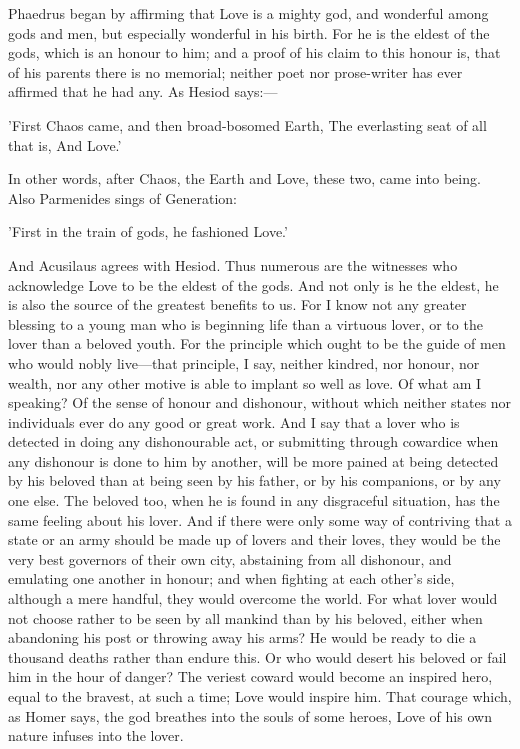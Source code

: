 \para[48] Phaedrus began by affirming that Love is a mighty god, and wonderful among gods and men, but especially wonderful in his birth. For he is the eldest of the gods, which is an honour to him; and a proof of his claim to this honour is, that of his parents there is no memorial; neither poet nor prose-writer has ever affirmed that he had any. As Hesiod says:---

\para[49] 'First Chaos came, and then broad-bosomed Earth, The everlasting seat of all that is, And Love.'

\para[50] In other words, after Chaos, the Earth and Love, these two, came into being. Also Parmenides sings of Generation:

\para[51] 'First in the train of gods, he fashioned Love.'

\para[52] And Acusilaus agrees with Hesiod. Thus numerous are the witnesses who acknowledge Love to be the eldest of the gods. And not only is he the eldest, he is also the source of the greatest benefits to us. For I know not any greater blessing to a young man who is beginning life than a virtuous lover, or to the lover than a beloved youth. For the principle which ought to be the guide of men who would nobly live---that principle, I say, neither kindred, nor honour, nor wealth, nor any other motive is able to implant so well as love. Of what am I speaking? Of the sense of honour and dishonour, without which neither states nor individuals ever do any good or great work. And I say that a lover who is detected in doing any dishonourable act, or submitting through cowardice when any dishonour is done to him by another, will be more pained at being detected by his beloved than at being seen by his father, or by his companions, or by any one else. The beloved too, when he is found in any disgraceful situation, has the same feeling about his lover. And if there were only some way of contriving that a state or an army should be made up of lovers and their loves, they would be the very best governors of their own city, abstaining from all dishonour, and emulating one another in honour; and when fighting at each other's side, although a mere handful, they would overcome the world. For what lover would not choose rather to be seen by all mankind than by his beloved, either when abandoning his post or throwing away his arms? He would be ready to die a thousand deaths rather than endure this. Or who would desert his beloved or fail him in the hour of danger? The veriest coward would become an inspired hero, equal to the bravest, at such a time; Love would inspire him. That courage which, as Homer says, the god breathes into the souls of some heroes, Love of his own nature infuses into the lover.

